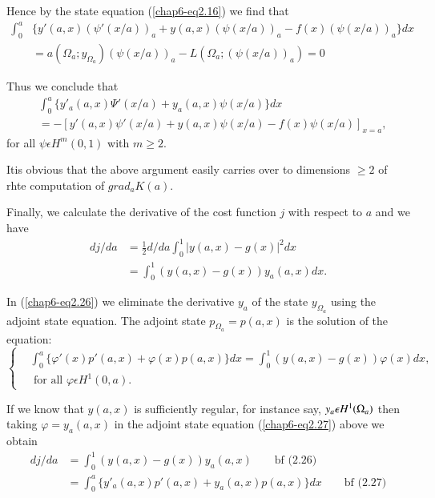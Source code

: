 Hence by the state equation (\ref{chap6-eq2.16}) we find that
\begin{align*}
\int_{0}^{a} & \{y' (a, x)(\psi'(x/a))_{a} + y(a, x)(\psi(x/a))_{a} - f(x) (\psi(x/a))_{a} \} dx\\
& = a (\Omega_{a} ; y_{\Omega_{a}}) (\psi(x/a))_{a} - L(\Omega_{a} ; (\psi(x/a))_{a}) = 0
\end{align*}

Thus we conclude that
\begin{align*}
& \int_{0}^{a} \{ y'_{a} (a, x) \Psi' (x/a) + y_{a}(a, x) \psi (x/a) \} dx\\
& = -  [ y'(a, x) \psi' (x/a) + y(a, x) \psi(x/a) - f(x) \psi (x/a)
  ]_{x=a}, \tag{2.25}\label{chap6-eq2.25}
\end{align*}
for all $\psi \epsilon H^{m} (0, 1)$ with $m \geq 2$.

\begin{remark}\label{chap6-rem2.3}
It\pageoriginale is obvious that the above argument easily carries
over to dimensions $\geq 2$ of rhte computation of $grad_{a} K(a)$. 

Finally, we calculate the derivative of the cost function $j$ with respect to $a$ and we have
\begin{align*}
dj/da & = \frac{1}{2} d/da \int_{0}^{1} |y(a, x) - g(x)|^{2} dx\\
& = \int_{0}^{1} (y(a, x) - g(x)) y_{a} (a, x) dx.\tag{2.26}\label{chap6-eq2.26}
\end{align*}
\end{remark}

In (\ref{chap6-eq2.26}) we eliminate the derivative $y_{a}$ of the
state $y_{\Omega_{a}}$ using the adjoint state equation. The adjoint
state $p_{\Omega_{a}} = p(a, x)$ is the solution of the equation: 
\begin{equation*}
\begin{cases}
& \int_{0}^{a} \{\varphi'(x) p' (a, x) + \varphi(x) p(a, x) \} dx = \int_{0}^{1} (y(a, x) - g(x)) \varphi(x) dx,\\
& \text{ for all } \varphi \epsilon H^{1} (0, a).\tag{2.27}\label{chap6-eq2.27}
\end{cases}
\end{equation*}

If we know that $y(a, x)$ is sufficiently regular, for instance say,
$y_{a} \epsilon H^{1}\break (\Omega_{a})$ then taking $\varphi = y_{a} (a,
x)$ in the adjoint state equation (\ref{chap6-eq2.27}) above we obtain 
\begin{align*}
dj/da & = \int_{0}^{1} (y(a, x) - g(x)) y_{a}(a, x) \qquad {\text{bf (2.26)}}\\
& = \int_{0}^{a} \{ y'_{a} (a, x) p'(a, x) + y_{a}(a, x)p(a, x) \} dx
\qquad {\text{bf (2.27)}}
\end{align*}

